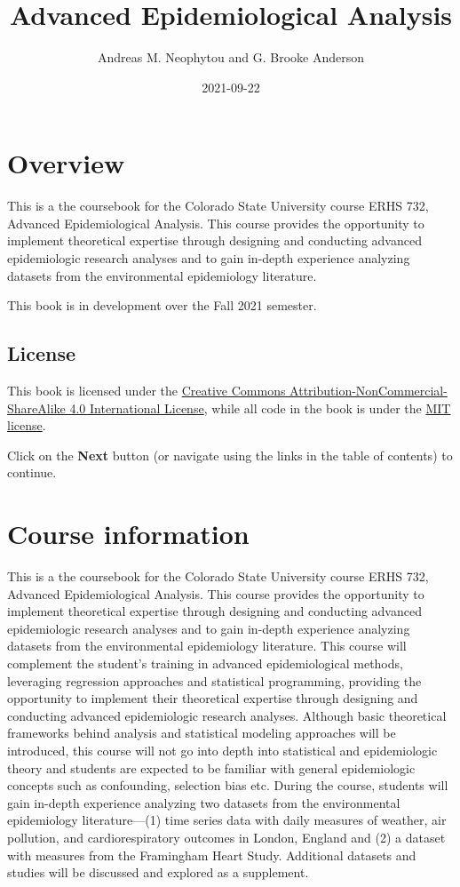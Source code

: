 \documentclass[
]{book}
\title{Advanced Epidemiological Analysis}
\author{Andreas M. Neophytou and G. Brooke Anderson}
\date{2021-09-22}
\begin{document}
\maketitle

{
\setcounter{tocdepth}{1}
\tableofcontents
}
\hypertarget{overview}{%
\chapter{Overview}\label{overview}}

This is a the coursebook for the Colorado State University course ERHS 732,
Advanced Epidemiological Analysis. This course provides the opportunity to
implement theoretical expertise through designing and conducting advanced
epidemiologic research analyses and to gain in-depth experience analyzing
datasets from the environmental epidemiology literature.

This book is in development over the Fall 2021 semester.

\hypertarget{license}{%
\section{License}\label{license}}

This book is licensed under the \href{https://creativecommons.org/licenses/by-nc-sa/4.0/}{Creative Commons
Attribution-NonCommercial-ShareAlike 4.0 International
License}, while all code in
the book is under the \href{https://opensource.org/licenses/MIT}{MIT license}.

Click on the \textbf{Next} button (or navigate using the links in the table of
contents) to continue.

\hypertarget{courseinfo}{%
\chapter{Course information}\label{courseinfo}}

This is a the coursebook for the Colorado State University course ERHS 732,
Advanced Epidemiological Analysis. This course provides the opportunity to
implement theoretical expertise through designing and conducting advanced
epidemiologic research analyses and to gain in-depth experience analyzing
datasets from the environmental epidemiology literature. This course will
complement the student's training in advanced epidemiological methods,
leveraging regression approaches and statistical programming, providing the
opportunity to implement their theoretical expertise through designing and
conducting advanced epidemiologic research analyses. Although basic theoretical frameworks behind analysis and statistical modeling approaches will be introduced, this course will not go into depth into statistical and epidemiologic theory and students are expected to be familiar with general epidemiologic concepts such as confounding, selection bias etc. During the course,
students will gain in-depth experience analyzing two datasets from the
environmental epidemiology literature---(1) time series data with daily measures
of weather, air pollution, and cardiorespiratory outcomes in London, England and
(2) a dataset with measures from the Framingham Heart Study. Additional datasets
and studies will be discussed and explored as a supplement.
\end{document}
